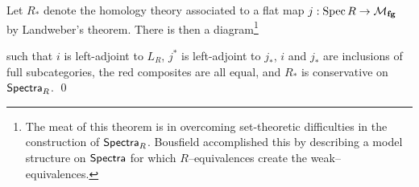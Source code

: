 \begin{theorem}[Bousfield]
Let $R_*$ denote the homology theory associated to a flat map $j: \operatorname{Spec} R \to \mathcal{M}_{\mathbf{fg}}$ by Landweber's theorem.  There is then a diagram\footnote{The meat of this theorem is in overcoming set-theoretic difficulties in the construction of $\mathsf{Spectra}_R$.  Bousfield accomplished this by describing a model structure on $\mathsf{Spectra}$ for which $R$--equivalences create the weak--equivalences.}
\begin{center}
\end{center}
such that $i$ is left-adjoint to $L_R$, $j^*$ is left-adjoint to $j_*$, $i$ and $j_*$ are inclusions of full subcategories, the red composites are all equal, and $R_*$ is conservative on $\mathsf{Spectra}_R$. \qed
\end{theorem}

